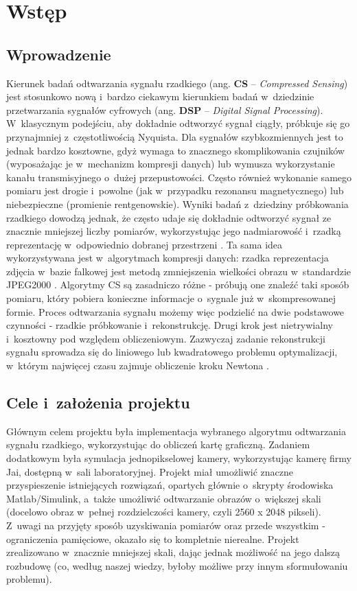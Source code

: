 \section{Wstęp}
\subsection{Wprowadzenie}
Kierunek badań odtwarzania sygnału rzadkiego (ang. \textbf{CS} – \textit{Compressed Sensing}) jest stosunkowo nową i bardzo ciekawym kierunkiem badań w~dziedzinie przetwarzania sygnałów cyfrowych (ang. \textbf{DSP} – \textit{Digital Signal Processing}). W~klasycznym podejściu, aby dokładnie odtworzyć sygnał ciągły, próbkuje się go przynajmniej z~częstotliwością Nyquista. Dla sygnałów szybkozmiennych jest to jednak bardzo kosztowne, gdyż wymaga to znacznego skomplikowania czujników (wyposażając je w~mechanizm kompresji danych) lub wymusza wykorzystanie kanału transmisyjnego o~dużej przepustowości. Często również wykonanie samego pomiaru jest drogie i~powolne (jak w~przypadku rezonansu magnetycznego) lub niebezpieczne (promienie rentgenowskie). Wyniki badań z~dziedziny próbkowania rzadkiego dowodzą jednak, że często udaje się dokładnie odtworzyć sygnał ze znacznie mniejszej liczby pomiarów, wykorzystując jego nadmiarowość i~rzadką reprezentację w~odpowiednio dobranej przestrzeni \cite{IntroductionCS}. Ta sama idea wykorzystywana jest w~algorytmach kompresji danych: rzadka reprezentacja zdjęcia w~bazie falkowej jest metodą zmniejszenia wielkości obrazu w~standardzie JPEG2000 \cite{JPEG2000}. Algorytmy CS są zasadniczo różne - próbują one znaleźć taki sposób pomiaru, który pobiera konieczne informacje o~sygnale już w~skompresowanej formie. Proces odtwarzania sygnału możemy więc podzielić na dwie podstawowe czynności - rzadkie próbkowanie i~rekonstrukcję. Drugi krok jest nietrywialny i~kosztowny pod względem obliczeniowym. Zazwyczaj zadanie rekonstrukcji sygnału sprowadza się do liniowego lub kwadratowego problemu optymalizacji, w~którym najwięcej czasu zajmuje obliczenie kroku Newtona \cite{L1MagicNotes}.

\subsection{Cele i~założenia projektu}
Głównym celem projektu była implementacja wybranego algorytmu odtwarzania sygnału rzadkiego, wykorzystując do obliczeń kartę graficzną. Zadaniem dodatkowym była symulacja jednopikselowej kamery, wykorzystując kamerę firmy Jai, dostępną w~sali laboratoryjnej. Projekt miał umożliwić znaczne przyspieszenie istniejących rozwiązań, opartych głównie o~skrypty środowiska Matlab/Simulink, a~także umożliwić odtwarzanie obrazów o~większej skali (docelowo obraz w~pełnej rozdzielczości kamery, czyli 2560 x 2048 pikseli). Z~uwagi na przyjęty sposób uzyskiwania pomiarów oraz przede wszystkim - ograniczenia pamięciowe, okazało się to kompletnie nierealne. Projekt zrealizowano w~znacznie mniejszej skali, dając jednak możliwość na jego dalszą rozbudowę (co, według naszej wiedzy, byłoby możliwe przy innym sformułowaniu problemu).


